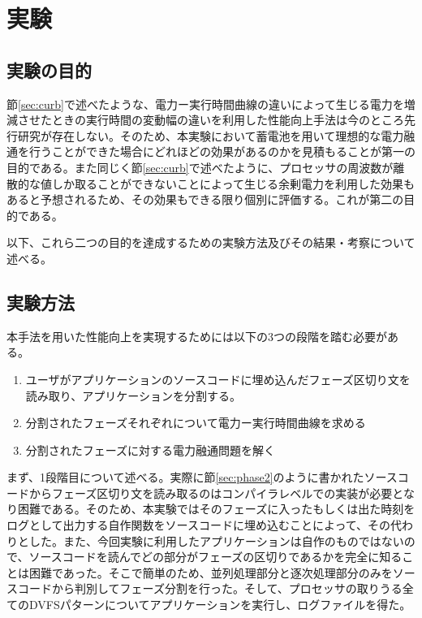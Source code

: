 \chapter{実験}
\label{chap:exeperiment}


\section{実験の目的}
\label{sec:purpose}

節\ref{sec:curb}で述べたような、電力ー実行時間曲線の違いによって生じる電力を増減させたときの実行時間の変動幅の違いを利用した性能向上手法は今のところ先行研究が存在しない。そのため、本実験において蓄電池を用いて理想的な電力融通を行うことができた場合にどれほどの効果があるのかを見積もることが第一の目的である。また同じく節\ref{sec:curb}で述べたように、プロセッサの周波数が離散的な値しか取ることができないことによって生じる余剰電力を利用した効果もあると予想されるため、その効果もできる限り個別に評価する。これが第二の目的である。

以下、これら二つの目的を達成するための実験方法及びその結果・考察について述べる。


\section{実験方法}
\label{sec:method}

本手法を用いた性能向上を実現するためには以下の3つの段階を踏む必要がある。

\begin{enumerate}
\item ユーザがアプリケーションのソースコードに埋め込んだフェーズ区切り文を読み取り、アプリケーションを分割する。
\item 分割されたフェーズそれぞれについて電力ー実行時間曲線を求める
\item 分割されたフェーズに対する電力融通問題を解く
\end{enumerate}

まず、1段階目について述べる。実際に節\ref{sec:phase2}のように書かれたソースコードからフェーズ区切り文を読み取るのはコンパイラレベルでの実装が必要となり困難である。そのため、本実験ではそのフェーズに入ったもしくは出た時刻をログとして出力する自作関数をソースコードに埋め込むことによって、その代わりとした。また、今回実験に利用したアプリケーションは自作のものではないので、ソースコードを読んでどの部分がフェーズの区切りであるかを完全に知ることは困難であった。そこで簡単のため、並列処理部分と逐次処理部分のみをソースコードから判別してフェーズ分割を行った。そして、プロセッサの取りうる全てのDVFSパターンについてアプリケーションを実行し、ログファイルを得た。

